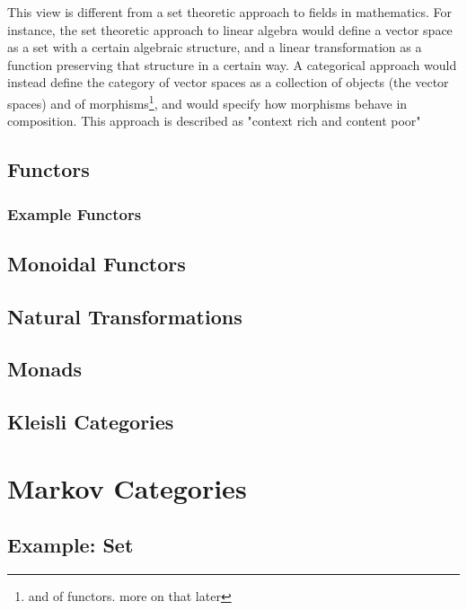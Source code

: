 This view is different from a set theoretic approach to fields in mathematics.
For instance, the set theoretic approach to linear algebra would define a vector space as a set with a certain algebraic structure, and a linear transformation as a function preserving that structure in a certain way.
A categorical approach would instead define the category of vector spaces as a collection of objects (the vector spaces) and of morphisms\footnote{and of functors. more on that later}, and would specify how morphisms behave in composition.
This approach is described as "context rich and content poor"


\subsection{Functors}
\subsubsection{Example Functors}
\subsection{Monoidal Functors}
\subsection{Natural Transformations}
\subsection{Monads}
\subsection{Kleisli Categories}

\section{Markov Categories}

\newcommand{\id}{\mathrm{id}}
\newcommand{\comul}{\Delta}
\newcommand{\counit}{\delta}

\subsection{Example: Set}
